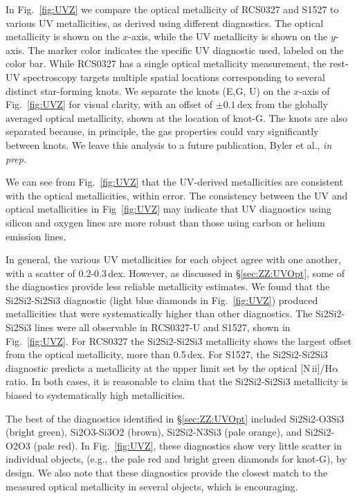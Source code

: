 \documentclass[preprint2]{aastex62}
\newcommand{\nii}{[N\,{\sc ii}]\xspace}
\newcommand{\ha}{\ensuremath{\mathrm{H\alpha}}\xspace}
\begin{document}
In Fig.~\ref{fig:UVZ} we compare the optical metallicity of RCS0327 and S1527 to various UV metallicities, as derived using different diagnostics. The optical metallicity is shown on the $x$-axis, while the UV metallicity is shown on the $y$-axis. The marker color indicates the specific UV diagnostic used, labeled on the color bar. While RCS0327 has a single optical metallicity measurement, the rest-UV spectroscopy targets multiple spatial locations corresponding to several distinct star-forming knots. We separate the knots (E,G, U) on the $x$-axis of Fig.~\ref{fig:UVZ} for visual clarity, with an offset of $\pm 0.1$\,dex from the globally averaged optical metallicity, shown at the location of knot-G. The knots are also separated because, in principle, the gas properties could vary significantly between knots. We leave this analysis to a future publication, Byler et al., \emph{in prep}.

We can see from Fig.~\ref{fig:UVZ} that the UV-derived metallicities are consistent with the optical metallicities, within error. The consistency between the UV and optical metallicities in Fig~\ref{fig:UVZ} may indicate that UV diagnostics using silicon and oxygen lines are more robust than those using carbon or helium emission lines.

In general, the various UV metallicities for each object agree with one another, with a scatter of 0.2-0.3\,dex. However, as discussed in \S\ref{sec:ZZ:UVOpt}, some of the diagnostics provide less reliable metallicity estimates. We found that the Si2Si2-Si2Si3 diagnostic (light blue diamonds in Fig.~\ref{fig:UVZ}) produced metallicities that were systematically higher than other diagnostics. The Si2Si2-Si2Si3 lines were all observable in RCS0327-U and S1527, shown in Fig.~\ref{fig:UVZ}. For RCS0327 the Si2Si2-Si2Si3 metallicity shows the largest offset from the optical metallicity, more than 0.5\,dex. For S1527, the Si2Si2-Si2Si3 diagnostic predicts a metallicity at the upper limit set by the optical \nii/\ha ratio. In both cases, it is reasonable to claim that the Si2Si2-Si2Si3 metallicity is biased to systematically high metallicities.

The best of the diagnostics identified in \S\ref{sec:ZZ:UVOpt} included Si2Si2-O3Si3 (bright green), Si2O3-Si3O2 (brown), Si2Si2-N3Si3 (pale orange), and Si2Si2-O2O3 (pale red). In Fig.~\ref{fig:UVZ}, these diagnostics show very little scatter in individual objects, (e.g., the pale red and bright green diamonds for knot-G), by design. We also note that these diagnostics provide the closest match to the measured optical metallicity in several objects, which is encouraging.
\end{document}
